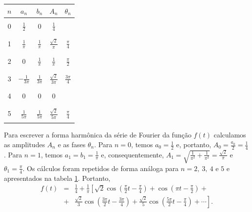 \begin{ex}
\begin{eqnarray*}
\end{eqnarray*}
\begin{table}[ht] 
\begin{center}
   \begin{tabular}{|c|c|c|c|c|}
   \hline
   $n$ & $a_n$ & $b_n$ & $A_n$&$\theta_n  $ \\
   \hline
   &&&&\\
   0& $\frac{1}{2}$ & 0 & $\frac{1}{4}$ & \\
   &&&&\\
   \hline
   &&&&\\
   1&$\frac{1}{\pi}$ & $\frac{1}{\pi}$ & $\frac{\sqrt{2}}{\pi}$ & $\frac{\pi}{4}$ \\
		&&&&\\
		\hline
		 &&&&\\
   2&$0$&$\frac{1}{\pi}$ & $\frac{1}{\pi}$ & $\frac{\pi}{2}$  \\
		&&&&\\
		\hline
		 &&&&\\
   3&$-\frac{1}{3\pi}$&$\frac{1}{3\pi}$& $\frac{\sqrt{2}}{3\pi}$ & $\frac{3\pi}{4}$\\
		&&&&\\
		\hline
		 &&&&\\
   4&$0$&$0$&0&\\
		&&&&\\
		\hline
		&&&&\\
		5&$\frac{1}{5\pi}$&$\frac{1}{5\pi}$&$\frac{\sqrt{2}}{5\pi}$&$\frac{\pi}{4}$ \\
		&&&&\\
		\hline
 \end{tabular}
 \caption{\label{tab_exponential_form}}
   \end{center}
\end{table}
Para escrever a forma harmônica da série de Fourier da função $f(t)$ calculamos as amplitudes $A_n$ e as fases $\theta_n$. Para $n=0$, temos $a_0=\frac{1}{2}$ e, portanto, $A_0=\frac{a_0}{2}=\frac{1}{4}$. Para $n=1$, temos $a_1=b_1=\frac{1}{\pi}$ e, consequentemente, $A_1=\sqrt{\frac{1}{\pi^2}+\frac{1}{\pi^2}}=\frac{\sqrt{2}}{\pi}$ e $\theta_1=\frac{\pi}{4}$. Os cálculos foram repetidos de forma análoga para $n=2,\ 3,\ 4$ e $5$ e apresentados na tabela \ref{tab_exponential_form}. Portanto,
\begin{eqnarray*}
f(t)&=&\frac{1}{4}+\frac{1}{\pi}\left[\sqrt{2}\cos\left(\frac{\pi }{2} t-\frac{\pi}{4}\right)+\cos\left(\pi  t-\frac{\pi}{2}\right)+\right.\\&+&\left.\frac{\sqrt{2}}{3}\cos\left(\frac{3 \pi }{2} t-\frac{3\pi}{4}\right)+\frac{\sqrt{2}}{5}\cos\left(\frac{5 \pi }{2} t-\frac{\pi }{4}\right)+\cdots   \right].
\end{eqnarray*}

\end{ex}
